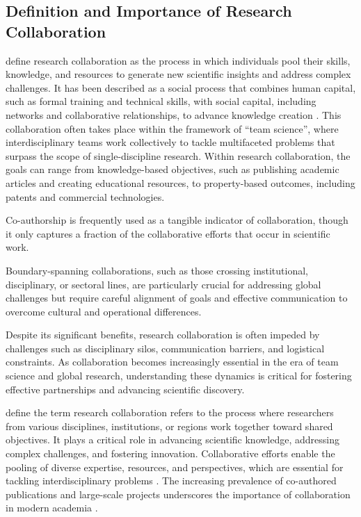 \subsection*{Definition and Importance of Research Collaboration}
\textcite{Bozeman2014} define research collaboration as the process in which individuals pool their skills, knowledge, and resources to generate new scientific insights and address complex challenges.
It has been described as a social process that combines human capital, such as formal training and technical skills, with social capital, including networks and collaborative relationships, to advance knowledge creation \cite{Bozeman2014}.
This collaboration often takes place within the framework of ``team science'', where interdisciplinary teams work collectively to tackle multifaceted problems that surpass the scope of single-discipline research.
Within research collaboration, the goals can range from knowledge-based objectives, such as publishing academic articles and creating educational resources, to property-based outcomes, including patents and commercial technologies.

Co-authorship is frequently used as a tangible indicator of collaboration, though it only captures a fraction of the collaborative efforts that occur in scientific work.

Boundary-spanning collaborations, such as those crossing institutional, disciplinary, or sectoral lines, are particularly crucial for addressing global challenges but require careful alignment of goals and effective communication to overcome cultural and operational differences.

Despite its significant benefits, research collaboration is often impeded by challenges such as disciplinary silos, communication barriers, and logistical constraints.
As collaboration becomes increasingly essential in the era of team science and global research, understanding these dynamics is critical for fostering effective partnerships and advancing scientific discovery.

\textcite{KATZ19971} define the term research collaboration refers to the process where researchers from various disciplines, institutions, or regions work together toward shared objectives.
It plays a critical role in advancing scientific knowledge, addressing complex challenges, and fostering innovation.
Collaborative efforts enable the pooling of diverse expertise, resources, and perspectives, which are essential for tackling interdisciplinary problems \cite{KATZ19971}.
The increasing prevalence of co-authored publications and large-scale projects underscores the importance of collaboration in modern academia \cite{Adams2012}.

